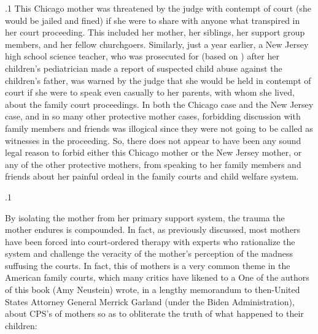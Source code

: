 \documentclass[11pt, twoside]{article}
\begin{document}
{\p.1{%
\noindent{}This Chicago mother was threatened by the judge with contempt of
court (she would be jailed and fined) if she were to share with anyone
what transpired in her court proceeding. This included her mother,
her siblings, her support group members, and her fellow churchgoers.
Similarly, just a year earlier, a New Jersey high school science teacher,
who was prosecuted for  (based on ) after her
children's pediatrician made a report of suspected child abuse against
the children's father, was warned by the judge that she would be held in
contempt of court if she were to speak even casually to her parents, with
whom she lived, about the family court proceedings. In both the Chicago
case and the New Jersey case, and in so many other protective mother
cases, forbidding discussion with family members and friends was illogical since they were not going to be called as witnesses in the proceeding.
So, there does not appear to have been any sound legal reason to forbid either this Chicago mother or the New Jersey mother, or any of
the other protective mothers, from speaking to her family members and
friends about her painful ordeal in the family courts and child welfare
system.
}%

\p.1{%
By isolating the mother from her primary support system, the trauma
the mother endures is compounded. In fact, as previously discussed,
most mothers have been forced into court-ordered therapy with experts who rationalize the system and challenge the veracity of the
mother's perception of the madness suffusing the courts. In fact, this
 of mothers is a very common theme in the American
family courts, which many critics have likened to a  One of the authors of this book (Amy Neustein) wrote, in a
lengthy memorandum to then-United States Attorney General Merrick
Garland (under the Biden Administration), about CPS's 
of mothers so as to obliterate the truth of what happened to their
children:

}}
\end{document}

